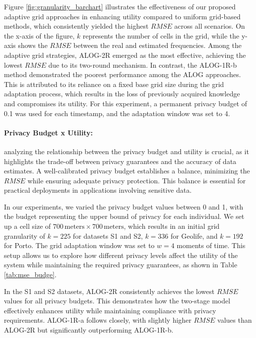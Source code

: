 Figure \ref{fig:granularity_barchart} illustrates the effectiveness of our proposed adaptive grid approaches in enhancing utility compared to uniform grid-based methods, which consistently yielded the highest $RMSE$ across all scenarios. On the x-axis of the figure, $k$ represents the number of cells in the grid, while the y-axis shows the $RMSE$ between the real and estimated frequencies. Among the adaptive grid strategies, ALOG-2R emerged as the most effective, achieving the lowest $RMSE$ due to its two-round mechanism. In contrast, the ALOG-1R-b method demonstrated the poorest performance among the ALOG approaches. This is attributed to its reliance on a fixed base grid size during the grid adaptation process, which results in the loss of previously acquired knowledge and compromises its utility. For this experiment, a permanent privacy budget of 0.1 was used for each timestamp, and the adaptation window was set to 4.

\paragraph{Privacy Budget x Utility:}analyzing the relationship between the privacy budget and utility is crucial, as it highlights the trade-off between privacy guarantees and the accuracy of data estimates. A well-calibrated privacy budget establishes a balance, minimizing the $RMSE$ while ensuring adequate privacy protection. This balance is essential for practical deployments in applications involving sensitive data. 

In our experiments, we varied the privacy budget values between 0 and 1, with the budget representing the upper bound of privacy for each individual. We set up a cell size of $700 \, \text{meters} \times 700 \, \text{meters} $, which results in an initial grid granularity of $k = 225$ for datasets S1 and S2, $k = 336$ for Geolife, and $k = 192$ for Porto. The grid adaptation window was set to $w = 4$ moments of time. This setup allows us to explore how different privacy levels affect the utility of the system while maintaining the required privacy guarantees, as shown in Table \ref{tab:mse_budge}.


In the S1 and S2 datasets, ALOG-2R consistently achieves the lowest $RMSE$ values for all privacy budgets. This demonstrates how the two-stage model effectively enhances utility while maintaining compliance with privacy requirements. ALOG-1R-a follows closely, with slightly higher $RMSE$ values than ALOG-2R but significantly outperforming ALOG-1R-b.

